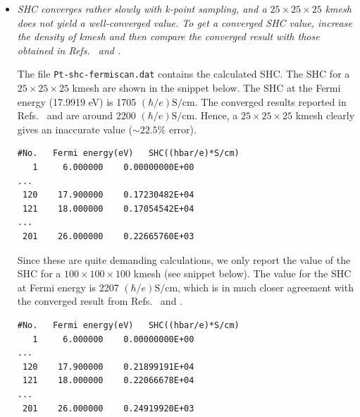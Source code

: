 \begin{itemize}
	\item {\it SHC converges rather slowly with k-point sampling, and a $25 \times 25 \times 25$ kmesh does not yield a well-converged value.
	To get a converged SHC value, increase the density of kmesh and 
	then compare the converged result with those obtained in 
	Refs.~ and .}

	The file {\tt Pt-shc-fermiscan.dat} contains the calculated SHC. 
	The SHC for a $25\times25\times25$ kmesh are shown in the snippet below. 
	The SHC at the Fermi energy (17.9919 eV) is 1705 $(\hbar/e)\mathrm{S/cm}$. 
	The converged results reported in Refs.~ 
	and  are around 2200 $(\hbar/e)\mathrm{S/cm}$. 
	Hence, a $25\times25\times25$ kmesh clearly gives an inaccurate value ($\sim 22.5\%$ error).   

\begin{tcolorbox}[title=$25\times25\times25$ kmesh,sharp corners,boxrule=0.5pt]
{\small
\begin{verbatim}
#No.   Fermi energy(eV)   SHC((hbar/e)*S/cm)
   1     6.000000    0.00000000E+00
...
 120    17.900000    0.17230482E+04
 121    18.000000    0.17054542E+04
...
 201    26.000000    0.22665760E+03
\end{verbatim}
}
\end{tcolorbox}

Since these are quite demanding calculations, we only report the 
value of the SHC for a $100\times100\times100$ kmesh (see snippet below). 
The value for the SHC at Fermi energy is 2207 $(\hbar/e)\mathrm{S/cm}$, which is 
in much closer agreement with the converged result from 
Refs.~ and .

\begin{tcolorbox}[title=$100\times100\times100$ kmesh,sharp corners,boxrule=0.5pt]
{\small
\begin{verbatim}
#No.   Fermi energy(eV)   SHC((hbar/e)*S/cm)
   1     6.000000    0.00000000E+00
...
 120    17.900000    0.21899191E+04
 121    18.000000    0.22066678E+04
...
 201    26.000000    0.24919920E+03
\end{verbatim}
}
\end{tcolorbox}


\end{itemize}
